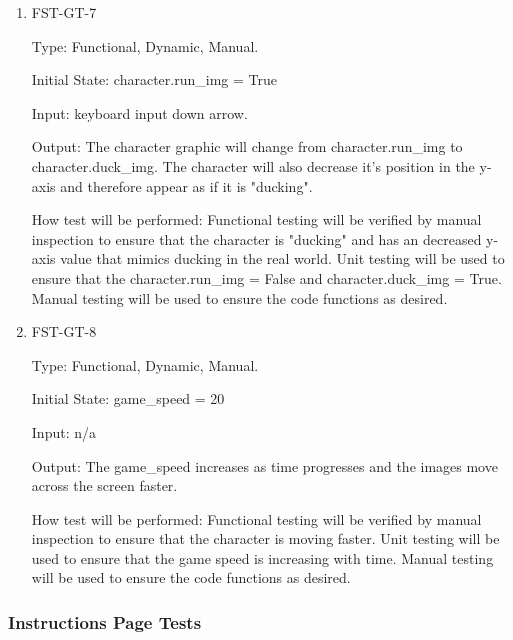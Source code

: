 \documentclass[12pt, titlepage]{article}
\begin{document}
\begin{enumerate}
\item{FST-GT-7\\}

Type: Functional, Dynamic, Manual.
					
Initial State: character.run\_img = True
					
Input: keyboard input down arrow. 
					
Output: The character graphic will change from character.run\_img to character.duck\_img. The character will also decrease it's position in the y-axis and therefore appear as if it is "ducking". 

How test will be performed: Functional testing will be verified by manual inspection to ensure that the character is "ducking" and has an decreased y-axis value that mimics ducking in the real world. Unit testing will be used to ensure that the character.run\_img = False and character.duck\_img = True. Manual testing will be used to ensure the code functions as desired. 

\item{FST-GT-8\\}

Type: Functional, Dynamic, Manual.
					
Initial State: game\_speed = 20
					
Input: n/a
					
Output: The game\_speed increases as time progresses and the images move across the screen faster. 

How test will be performed: Functional testing will be verified by manual inspection to ensure that the character is moving faster. Unit testing will be used to ensure that the game speed is increasing with time. Manual testing will be used to ensure the code functions as desired. 


\end{enumerate}


\subsubsection{Instructions Page Tests}
\end{document}
